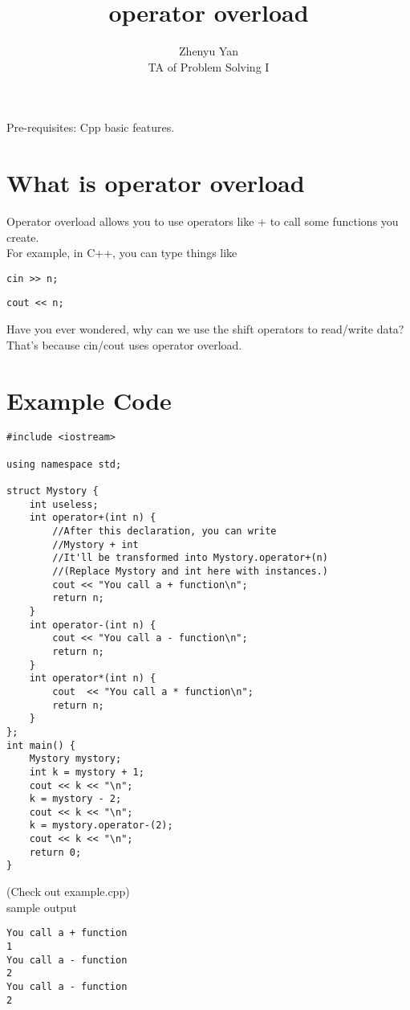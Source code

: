 \documentclass{article}
\title{operator overload}
\author{Zhenyu Yan\\TA of Problem Solving I}
\date{}
\begin{document}
\maketitle
Pre-requisites: Cpp basic features.
\section{What is operator overload}
Operator overload allows you to use operators like + to call some functions you create.\\
For example, in C++, you can type things like
\begin{lstlisting}
cin >> n;
\end{lstlisting}
\begin{lstlisting}
cout << n;
\end{lstlisting}
Have you ever wondered, why can we use the shift operators to read/write data?\\
That's because cin/cout uses operator overload.
\newpage
\section{Example Code}
\begin{lstlisting}
#include <iostream>

using namespace std;

struct Mystory {
    int useless;
    int operator+(int n) {
        //After this declaration, you can write
        //Mystory + int
        //It'll be transformed into Mystory.operator+(n)
        //(Replace Mystory and int here with instances.)
        cout << "You call a + function\n";
        return n;
    }
    int operator-(int n) {
        cout << "You call a - function\n";
        return n;
    }
    int operator*(int n) {
        cout  << "You call a * function\n";
        return n;
    }
};
int main() {
    Mystory mystory;
    int k = mystory + 1;
    cout << k << "\n";
    k = mystory - 2;
    cout << k << "\n";
    k = mystory.operator-(2);
    cout << k << "\n";
    return 0;
}
\end{lstlisting}
(Check out example.cpp)\\
sample output
\begin{lstlisting}
You call a + function
1
You call a - function
2
You call a - function
2
\end{lstlisting}
\newpage
\end{document}
